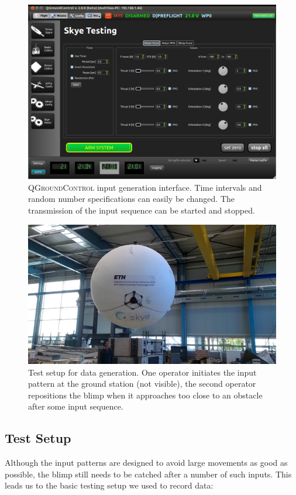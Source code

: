 \begin{figure}[H]
\captionsetup{width=0.9\textwidth}
\centering
\includegraphics[width=.9\textwidth]{images/qgc/QGroundControl_v_2.png}
\caption{\textsc{QGroundControl} input generation interface. Time intervals and random number specifications can easily be changed. The transmission of the input sequence can be started and stopped.}
\label{fig:qgc_input_gen}
\end{figure}

\begin{figure}[H]
\captionsetup{width=0.9\textwidth}
\centering
\includegraphics[width=.9\textwidth]{images/foto_testing_setup.jpg}
\caption{Test setup for data generation. One operator initiates the input pattern at the ground station (not visible), the second operator repositions the blimp when it approaches too close to an obstacle after some input sequence.}
\label{fig:test_setup}
\end{figure}

\subsection{Test Setup}
\label{sub:testing_setup}
Although the input patterns are designed to avoid large movements as good as possible, the blimp still needs to be catched after a number of such inputs.
This leads us to the basic testing setup we used to record data: \\

